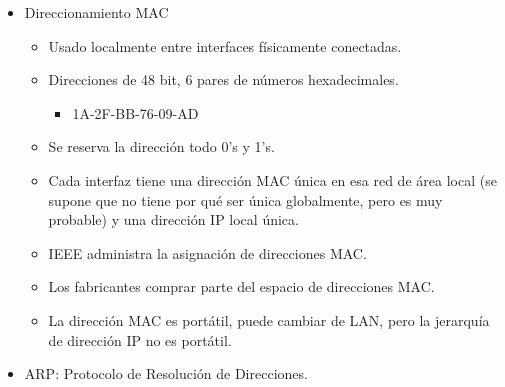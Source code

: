 \documentclass[12pt, twoside, openright]{report} %
\begin{document}
\begin{itemize}
	\item Direccionamiento MAC

	      \begin{itemize}
		      \item Usado localmente entre interfaces físicamente conectadas.
		      \item Direcciones de 48 bit, 6 pares de números hexadecimales.

		            \begin{itemize}
			            \item 1A-2F-BB-76-09-AD
		            \end{itemize}
		      \item Se reserva la dirección todo 0's y 1's.
		      \item Cada interfaz tiene una dirección MAC única en esa red de área
		            local (se supone que no tiene por qué ser única globalmente,
		            pero es muy probable) y una dirección IP local única.
		      \item IEEE administra la asignación de direcciones MAC.
		      \item Los fabricantes comprar parte del espacio de direcciones MAC.
		      \item La dirección MAC es portátil, puede cambiar de LAN, pero la
		            jerarquía de dirección IP no es portátil.
	      \end{itemize}
	\item ARP: Protocolo de Resolución de Direcciones.


\end{itemize}
\end{document}
